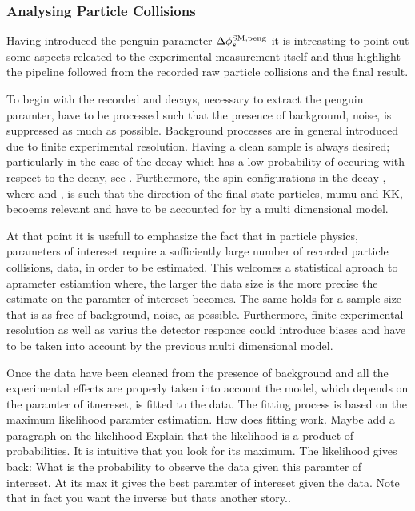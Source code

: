 \subsubsection{Analysing Particle Collisions}
Having introduced the penguin parameter $\Delta\phi_{s}^{\tiny\text{SM,peng}}$ it is intreasting to point out some
aspects releated to the experimental measurement itself and thus highlight the pipeline followed from
the recorded raw particle collisions and the final result.

To begin with the recorded \BsJpsiKst and \BsJpsiRho decays, necessary to extract the penguin paramter,
have to be processed such that the presence of background, noise, is suppressed as much as possible.
Background processes are in general introduced due to finite experimental resolution. Having a clean
sample is always desired; particularly in the case of the \BsJpsiKst decay which has a low probability
of occuring with respect to the \BdJpsiKst decay, see \figref{}. Furthermore, the spin configurations
in the \BsJpsiPhi decay , where \Jpsimumu and \phiKK, is such that the direction of the final state
particles, mumu and KK, becoems relevant and have to be accounted for by a multi dimensional model.

At that point it is usefull to emphasize the fact that in particle physics, parameters of intereset
require a sufficiently large number of recorded particle collisions, data, in order to be estimated.
This welcomes a statistical aproach to aprameter estiamtion where, the larger the data size is the
more precise the estimate on the paramter of intereset becomes. The same holds for a sample size that
is as free of background, noise, as possible. Furthermore, finite experimental resolution as well as
varius the detector responce could introduce biases and have to be taken into account by the previous
multi dimensional model.

Once the data have been cleaned from the presence of background and all the experimental effects are
properly taken into account the model, which depends on the paramter of itnereset, is fitted to the data.
The fitting process is based on the maximum likelihood paramter estimation.
How does fitting work.{\color{red} Maybe add a paragraph on the likelihood}
Explain that the likelihood is a product of probabilities. It is intuitive that you look for its maximum.
The likelihood gives back: What is the probability to observe the data given this paramter of intereset.
At its max it gives the best paramter of intereset given the data. Note that in fact you want the inverse
but thats another story..

